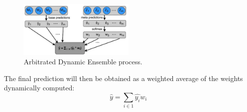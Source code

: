 \begin{figure}[H]
    \centering
    \includegraphics[width=0.50\textwidth]{Machine_learning_thesis/Images/Arbitrated Dynamic Ensemble.png}
    \caption{Arbitrated Dynamic Ensemble process.} 
    \label{fig: Arbitrated Dynamic Ensemble}
\end{figure} 
The final prediction will then be obtained as a weighted average of the weights dynamically computed: 
\[
\hat{y} = \sum_{i \in 1} \hat{y_i} w_i
\]


